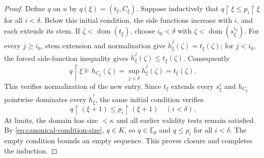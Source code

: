 \documentclass[10pt,a4paper]{amsart}
\theoremstyle{definition}
\theoremstyle{remark}
\newcommand{\EE}{\mathbb E}
\DeclareMathOperator{\dom}{dom}
\begin{document}
\begin{proof}
Define \(q\) on \(u\) by \(q(\xi)=(t_\xi,C_\xi)\).
Suppose inductively that
\(q\restriction\xi\leq p_i\restriction\xi\) for
all \(i<\delta\). Below this initial condition, the
side functions increase with \(i\), and each extends
its stem. If \(\zeta<\dom(t_\xi)\), choose
\(i_0<\delta\) with \(\zeta<\dom(s_\xi^{i_0})\).
For every \(j\geq i_0\), stem extension and
normalization give
\(\dot h_\xi^j(\zeta)=t_\xi(\zeta)\); for
\(j<i_0\), the forced side-function inequality gives
\(\dot h_\xi^j(\zeta)\leq t_\xi(\zeta)\).
Consequently
\[
 q\restriction\xi\Vdash
 \dot h_{C_\xi}(\zeta)
      =\sup_{j<\delta}\dot h_\xi^j(\zeta)=t_\xi(\zeta).
\]
This verifies normalization of the new entry. Since
\(t_\xi\) extends every \(s_\xi^i\) and
\(\dot h_{C_\xi}\) pointwise dominates every
\(\dot h_\xi^i\), the same initial condition verifies
\[
 q\restriction(\xi+1)\leq p_i\restriction(\xi+1)
                                      \quad(i<\delta).
\]
At limits, the domain has size \(<\kappa\) and all
earlier validity tests remain satisfied. By
\eqref{eq:canonical-condition-size}, \(q\in K\),
so \(q\in\EE_\theta\) and \(q\leq p_i\) for
all \(i<\delta\). The empty condition bounds an
empty sequence. This proves closure and completes the
induction.
\end{proof}
\end{document}
